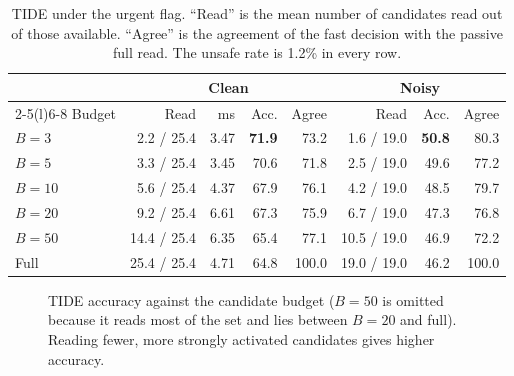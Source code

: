 \documentclass[12pt,a4paper,oneside]{report}
\begin{document}
\begin{table}[H]
\centering
\caption{TIDE under the urgent flag. ``Read'' is the mean number of candidates read out of those available. ``Agree'' is the agreement of the fast decision with the passive full read. The unsafe rate is 1.2\% in every row.}
\label{tab:tide}
\small
\begin{tabular}{@{}l rrrr rrr@{}}
\toprule
& \multicolumn{4}{c}{Clean} & \multicolumn{3}{c}{Noisy}\\
\cmidrule(lr){2-5}\cmidrule(l){6-8}
Budget & Read & ms & Acc. & Agree & Read & Acc. & Agree\\
\midrule
$B=3$ & 2.2 / 25.4 & 3.47 & \textbf{71.9} & 73.2 & 1.6 / 19.0 & \textbf{50.8} & 80.3\\
$B=5$ & 3.3 / 25.4 & 3.45 & 70.6 & 71.8 & 2.5 / 19.0 & 49.6 & 77.2\\
$B=10$ & 5.6 / 25.4 & 4.37 & 67.9 & 76.1 & 4.2 / 19.0 & 48.5 & 79.7\\
$B=20$ & 9.2 / 25.4 & 6.61 & 67.3 & 75.9 & 6.7 / 19.0 & 47.3 & 76.8\\
$B=50$ & 14.4 / 25.4 & 6.35 & 65.4 & 77.1 & 10.5 / 19.0 & 46.9 & 72.2\\
Full & 25.4 / 25.4 & 4.71 & 64.8 & 100.0 & 19.0 / 19.0 & 46.2 & 100.0\\
\bottomrule
\end{tabular}
\end{table}

\begin{figure}[H]
\centering
{}
\caption{TIDE accuracy against the candidate budget ($B=50$ is omitted because it reads most of the set and lies between $B=20$ and full). Reading fewer, more strongly activated candidates gives higher accuracy.}
\label{fig:tide}
\end{figure}
\end{document}

